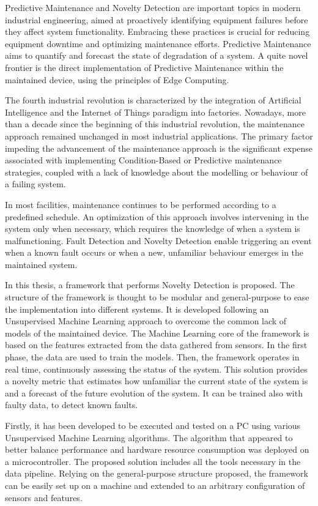 Predictive Maintenance and Novelty Detection are important topics in modern industrial engineering, aimed at proactively identifying equipment failures before they affect system functionality. Embracing these practices is crucial for reducing equipment downtime and optimizing maintenance efforts. Predictive Maintenance aims to quantify and forecast the state of degradation of a system. A quite novel frontier is the direct implementation of Predictive Maintenance within the maintained device, using the principles of Edge Computing.

The fourth industrial revolution is characterized by the integration of Artificial Intelligence and the Internet of Things paradigm into factories. Nowadays, more than a decade since the beginning of this industrial revolution, the maintenance approach remained unchanged in most industrial applications. The primary factor impeding the advancement of the maintenance approach is the significant expense associated with implementing Condition-Based or Predictive maintenance strategies, coupled with a lack of knowledge about the modelling or behaviour of a failing system.

In most facilities, maintenance continues to be performed according to a predefined schedule. An optimization of this approach involves intervening in the system only when necessary, which requires the knowledge of when a system is malfunctioning. Fault Detection and Novelty Detection enable triggering an event when a known fault occurs or when a new, unfamiliar behaviour emerges in the maintained system. 

In this thesis, a framework that performs Novelty Detection is proposed. The structure of the framework is thought to be modular and general-purpose to ease the implementation into different systems. It is developed following an Unsupervised Machine Learning approach to overcome the common lack of models of the maintained device. The Machine Learning core of the framework is based on the features extracted from the data gathered from sensors. In the first phase, the data are used to train the models. Then, the framework operates in real time, continuously assessing the status of the system. This solution provides a novelty metric that estimates how unfamiliar the current state of the system is and a forecast of the future evolution of the system. It can be trained also with faulty data, to detect known faults.

Firstly, it has been developed to be executed and tested on a PC using various Unsupervised Machine Learning algorithms. The algorithm that appeared to better balance performance and hardware resource consumption was deployed on a microcontroller. The proposed solution includes all the tools necessary in the data pipeline. Relying on the general-purpose structure proposed, the framework can be easily set up on a machine and extended to an arbitrary configuration of sensors and features. 


